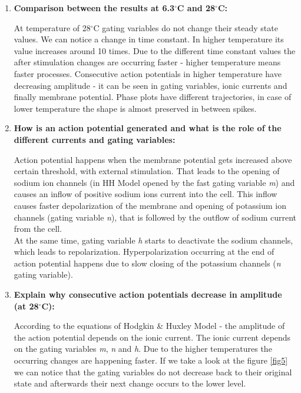 \documentclass{scrartcl}			%
\begin{document}
\begin{enumerate}
\item \textbf{Comparison between the results at 6.3$^{\circ}$C and 28$^{\circ}$C:\\}

At temperature of 28$^{\circ}$C gating variables do not change their steady state values. We can notice a change in time constant. In higher temperature its value increases around 10 times. Due to the different time constant values the after stimulation changes are occurring faster - higher temperature means faster processes. Consecutive action potentials in higher temperature have decreasing amplitude - it can be seen in gating variables, ionic currents and finally membrane potential. Phase plots have different trajectories, in case of lower temperature the shape is almost preserved in between spikes.


\item  \textbf{How is an action potential generated and what is the role of the different currents and gating variables:\\}

Action potential happens when the membrane potential gets increased above certain threshold, with external stimulation. That leads to the opening of sodium ion channels (in HH Model opened by the fast gating variable \textit{m}) and causes an inflow of positive sodium ions current into the cell. This inflow causes faster depolarization of the membrane and opening of potassium ion channels (gating variable \textit{n}), that is followed by the outflow of sodium current from the cell.\\ At the same time, gating variable \textit{h} starts to deactivate the sodium channels, which leads to repolarization. Hyperpolarization occurring at the end of action potential happens due to slow closing of the potassium channels (\textit{n} gating variable).

\item \textbf{Explain why consecutive action potentials decrease in amplitude (at 28$^{\circ}$C):\\}

According to the equations of Hodgkin \& Huxley Model - the amplitude of the action potential depends on the ionic current. The ionic current depends on the gating variables \textit{m}, \textit{n} and \textit{h}. Due to the higher temperatures the occurring changes are happening faster. If we take a look at the figure \ref{fig5} we can notice that the gating variables do not decrease back to their original state and afterwards their next change occurs to the lower level.\\


\end{enumerate}
\end{document}
